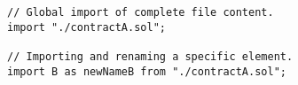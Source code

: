 \begin{lstlisting}[language=Solidity]
// Global import of complete file content.
import "./contractA.sol";

// Importing and renaming a specific element. 
import B as newNameB from "./contractA.sol"; 
\end{lstlisting}